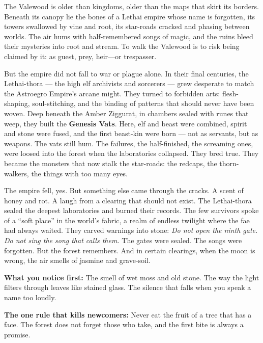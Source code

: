 \vspace{2mm}
\begin{tcolorbox}[colback=black!3,colframe=blue!60!black,title={Theme \& Atmosphere},breakable]
The Valewood is older than kingdoms, older than the maps that skirt its borders. Beneath its canopy lie the bones of a Lethai empire whose name is forgotten, its towers swallowed by vine and root, its star-roads cracked and phasing between worlds. The air hums with half-remembered songs of magic, and the ruins bleed their mysteries into root and stream. To walk the Valewood is to risk being claimed by it: as guest, prey, heir---or trespasser.

But the empire did not fall to war or plague alone. In their final centuries, the Lethai-thora --- the high elf archivists and sorcerers --- grew desperate to match the Astroegro Empire's arcane might. They turned to forbidden arts: flesh-shaping, soul-stitching, and the binding of patterns that should never have been woven. Deep beneath the Amber Ziggurat, in chambers sealed with runes that weep, they built the \textbf{Genesis Vats}. Here, elf and beast were combined, spirit and stone were fused, and the first beast-kin were born --- not as servants, but as weapons. The vats still hum. The failures, the half-finished, the screaming ones, were loosed into the forest when the laboratories collapsed. They bred true. They became the monsters that now stalk the star-roads: the redcaps, the thorn-walkers, the things with too many eyes.

The empire fell, yes. But something else came through the cracks. A scent of honey and rot. A laugh from a clearing that should not exist. The Lethai-thora sealed the deepest laboratories and burned their records. The few survivors spoke of a ``soft place'' in the world's fabric, a realm of endless twilight where the fae had always waited. They carved warnings into stone: \textit{Do not open the ninth gate. Do not sing the song that calls them.} The gates were sealed. The songs were forgotten. But the forest remembers. And in certain clearings, when the moon is wrong, the air smells of jasmine and grave-soil.

\vspace{2mm}
\textbf{What you notice first:} The smell of wet moss and old stone. The way the light filters through leaves like stained glass. The silence that falls when you speak a name too loudly.

\textbf{The one rule that kills newcomers:} Never eat the fruit of a tree that has a face. The forest does not forget those who take, and the first bite is always a promise.
\end{tcolorbox}

